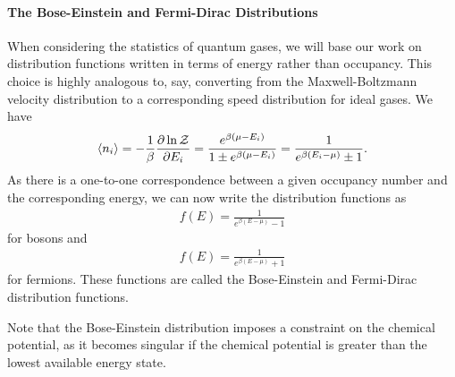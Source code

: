 \paragraph{The Bose-Einstein and Fermi-Dirac Distributions}
When considering the statistics of quantum gases, we will base our work on distribution functions written in terms of energy rather than occupancy. This choice is highly analogous to, say, converting from the Maxwell-Boltzmann velocity distribution to a corresponding speed distribution for ideal gases. We have
\begin{align*}
\expval{n_{i}} = -\frac{1}{\beta}\pdv{\ln{\mathcal{Z}}}{E_{i}} = \frac{e^{\beta(\mu - E_{i})}}{1 \pm e^{\beta(\mu - E_{i})}} = \frac{1}{e^{\beta(E_{i} - \mu)} \pm 1}.
\end{align*}
As there is a one-to-one correspondence between a given occupancy number and the corresponding energy, we can now write the distribution functions as
\begin{align*}
f(E) = \frac{1}{e^{\beta(E - \mu)} - 1}
\end{align*}
for bosons and
\begin{align*}
f(E) = \frac{1}{e^{\beta(E - \mu)} + 1}
\end{align*}
for fermions. These functions are called the Bose-Einstein and Fermi-Dirac distribution functions.

Note that the Bose-Einstein distribution imposes a constraint on the chemical potential, as it becomes singular if the chemical potential is greater than the lowest available energy state.

